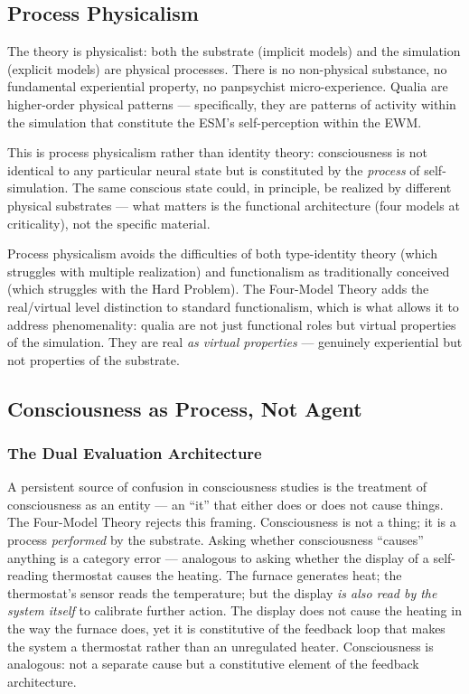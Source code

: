 \documentclass[12pt]{article}
\newcommand{\revstart}{}
\newcommand{\revend}{}
\begin{document}
\subsection{Process Physicalism}


The theory is physicalist: both the substrate (implicit models) and the simulation (explicit models) are physical processes. There is no non-physical substance, no fundamental experiential property, no panpsychist micro-experience. Qualia are higher-order physical patterns --- specifically, they are patterns of activity within the simulation that constitute the ESM's self-perception within the EWM.

This is process physicalism rather than identity theory: consciousness is not identical to any particular neural state but is constituted by the \emph{process} of self-simulation. The same conscious state could, in principle, be realized by different physical substrates --- what matters is the functional architecture (four models at criticality), not the specific material.

Process physicalism avoids the difficulties of both type-identity theory (which struggles with multiple realization) and functionalism as traditionally conceived (which struggles with the Hard Problem). The Four-Model Theory adds the real/virtual level distinction to standard functionalism, which is what allows it to address phenomenality: qualia are not just functional roles but virtual properties of the simulation. They are real \emph{as virtual properties} --- genuinely experiential but not properties of the substrate.


\subsection{Consciousness as Process, Not Agent}



\subsubsection{The Dual Evaluation Architecture}


A persistent source of confusion in consciousness studies is the treatment of consciousness as an entity --- an ``it'' that either does or does not cause things. The Four-Model Theory rejects this framing. Consciousness is not a thing; it is a process \emph{performed} by the substrate. Asking whether consciousness ``causes'' anything is a category error --- {\revstart analogous to asking whether the display of a self-reading thermostat causes the heating. The furnace generates heat; the thermostat's sensor reads the temperature; but the display \emph{is also read by the system itself} to calibrate further action. The display does not cause the heating in the way the furnace does, yet it is constitutive of the feedback loop that makes the system a thermostat rather than an unregulated heater. Consciousness is analogous: not a separate cause but a constitutive element of the feedback architecture.\revend}
\end{document}
